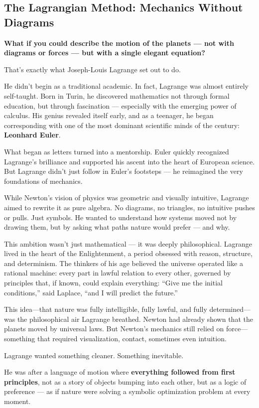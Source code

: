 \subsection{The Lagrangian Method: Mechanics Without Diagrams}

\textbf{What if you could describe the motion of the planets — not with diagrams or forces — but with a single elegant equation?}

That’s exactly what Joseph-Louis Lagrange set out to do.

He didn’t begin as a traditional academic. In fact, Lagrange was almost entirely self-taught. Born in Turin, he discovered mathematics not through formal education, but through fascination — especially with the emerging power of calculus. His genius revealed itself early, and as a teenager, he began corresponding with one of the most dominant scientific minds of the century: \textbf{Leonhard Euler}.

What began as letters turned into a mentorship. Euler quickly recognized Lagrange’s brilliance and supported his ascent into the heart of European science. But Lagrange didn’t just follow in Euler’s footsteps — he reimagined the very foundations of mechanics.

While Newton's vision of physics was geometric and visually intuitive, Lagrange aimed to rewrite it as pure algebra. No diagrams, no triangles, no intuitive pushes or pulls. Just symbols. He wanted to understand how systems moved not by drawing them, but by asking what paths nature would prefer — and why.

This ambition wasn’t just mathematical — it was deeply philosophical. Lagrange lived in the heart of the Enlightenment, a period obsessed with reason, structure, and determinism. The thinkers of his age believed the universe operated like a rational machine: every part in lawful relation to every other, governed by principles that, if known, could explain everything:  ``Give me the initial conditions,'' said Laplace, ``and I will predict the future.''

This idea—that nature was fully intelligible, fully lawful, and fully determined—was the philosophical air Lagrange breathed. Newton had already shown that the planets moved by universal laws. But Newton’s mechanics still relied on force—something that required visualization, contact, sometimes even intuition.

Lagrange wanted something cleaner. Something inevitable.

He was after a language of motion where \textbf{everything followed from first principles}, not as a story of objects bumping into each other, but as a logic of preference — as if nature were solving a symbolic optimization problem at every moment.

